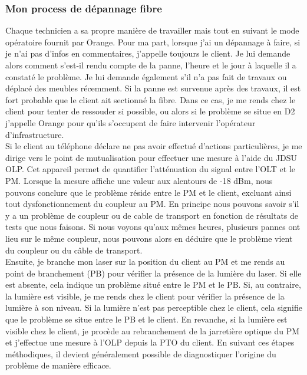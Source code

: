 \documentclass[12pt, a4paper]{article}
\begin{document}
\subsubsection{Mon process de dépannage fibre}
Chaque technicien a sa propre manière de travailler mais tout en 
suivant le mode opératoire fournit par Orange. Pour ma part, 
lorsque j'ai un dépannage à faire, si je n'ai pas d'infos en commentaires,
j'appelle toujours le client. Je lui demande alors comment s'est-il
rendu compte de la panne, l'heure et le jour à laquelle il a 
constaté le problème. Je lui demande également s'il n'a pas fait de travaux
ou déplacé des meubles récemment. Si la panne est survenue après
des travaux, il est fort probable que le client ait sectionné la fibre.
Dans ce cas, je me rends chez le client pour tenter de ressouder si possible, 
ou alors si le problème se situe
en \gls{D2}
j'appelle Orange pour qu'ils s'occupent de faire intervenir l'opérateur
d'infrastructure.\\

Si le client au téléphone déclare ne pas avoir
effectué d'actions particulières, je me dirige
vers le point de mutualisation pour effectuer
une mesure à l'aide du JDSU OLP. Cet appareil
permet de quantifier l'atténuation du signal
entre l'OLT et le PM. Lorsque la mesure affiche
une valeur aux alentours de -18 dBm, nous pouvons
conclure que le problème réside entre le PM et
le client, excluant ainsi tout dysfonctionnement
du coupleur au PM. En principe nous pouvons savoir 
s'il y a un problème de coupleur ou de cable de transport 
en fonction de résultats de tests que nous faisons. Si nous 
voyons qu'aux mêmes heures, plusieurs pannes ont lieu sur
le même coupleur, nous pouvons alors en déduire que le problème
vient du coupleur ou du câble de transport.\\

Ensuite, je branche mon laser sur la position du client au
PM et me rends au point de branchement
(PB) pour vérifier la présence de la lumière
du laser. Si elle est absente, cela indique
un problème situé entre le PM et le PB.
Si, au contraire, la lumière est visible,
je me rends chez le client pour vérifier
la présence de la lumière à son niveau.
Si la lumière n'est pas perceptible chez le
client, cela signifie que le problème se
situe entre le PB et le client. En revanche,
si la lumière est visible chez le client,
je procède au rebranchement de la jarretière
optique du PM et j'effectue une mesure à l'OLP
depuis la PTO du client. En suivant ces étapes
méthodiques, il devient généralement possible
de diagnostiquer l'origine du problème de
manière efficace.
\end{document}
